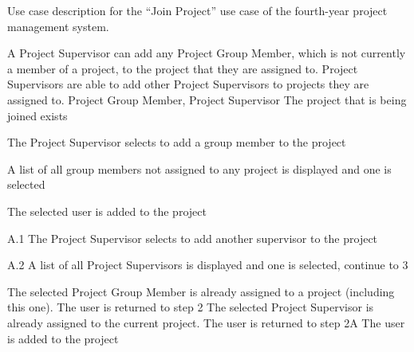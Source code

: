 \documentclass[document.tex]{subfiles}
\begin{document}
\begin{table}
  \centering
  \caption{Use case description for the ``Join Project'' use case of the fourth-year project management system.}
  \label{tbl:use-case-join-project}

  \begin{usecase}
    A Project Supervisor can add any Project Group Member, which is not currently a member of a project, to the project that they are assigned to. Project Supervisors are able to add other Project Supervisors to projects they are assigned to.
    Project Group Member, Project Supervisor
    The project that is being joined exists
    \ucnormal
    \begin{ucenum}
      \item The Project Supervisor selects to add a group member to the project
      \item A list of all group members not assigned to any project is displayed and one is selected
      \item The selected user is added to the project
    \end{ucenum}
    \begin{ucenum}
      \item [A.1] The Project Supervisor selects to add another supervisor to the project
      \item [A.2] A list of all Project Supervisors is displayed and one is selected, continue to 3
    \end{ucenum}
    The selected Project Group Member is already assigned to a project (including this one). The user is returned to step 2
    The selected Project Supervisor is already assigned to the current project. The user is returned to step 2A
    The user is added to the project
  \end{usecase}
\end{table}
\end{document}
